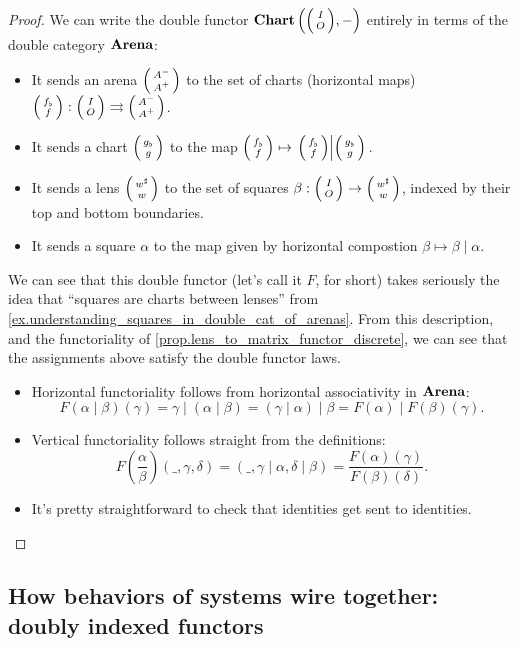 \documentclass[DynamicalBook]{subfiles}
\begin{document}
\begin{proof}
 

We can write the double functor $\Cat{Chart}\left(\littlelens{I}{O}, - \right)$
entirely in terms of the double category $\textbf{Arena}$:
\begin{itemize}
  \item It sends an arena $\lens{A^-}{A^+}$ to the set of charts (horizontal
    maps) $\lens{f_{\flat}}{f} : \lens{I}{O}  \tto \lens{A^-}{A^+}$.
  \item It sends a chart $\lens{g_{\flat}}{g}$ to the map $\lens{f_{\flat}}{f}
    \mapsto \left. \lens{f_{\flat}}{f} \middle| \lens{g_{\flat}}{g} \right.$.
  \item It sends a lens $\lens{w^{\sharp}}{w}$ to the set of squares $\beta :
    \lens{I}{O} \to \lens{w^{\sharp}}{w}$, indexed by their top and bottom
    boundaries.
  \item It sends a square $\alpha$ to the map given by horizontal compostion
    $\beta \mapsto \beta \mid \alpha$.
\end{itemize}

We can see that this double functor (let's call it $F$, for short) takes seriously the idea that ``squares are
charts between lenses'' from
\cref{ex.understanding_squares_in_double_cat_of_arenas}. From this description,
and the functoriality of \cref{prop.lens_to_matrix_functor_discrete}, we can see
that the assignments above satisfy the double functor laws. 
\begin{itemize}
  \item Horizontal functoriality follows from horizontal associativity in
    $\textbf{Arena}$:
$$F(\alpha\mid \beta)(\gamma) = \gamma \mid (\alpha \mid \beta) = (\gamma \mid
\alpha) \mid \beta = F(\alpha) \mid F(\beta) (\gamma).$$
\item Vertical functoriality follows straight from the definitions:
  $$F\left( \frac{\alpha}{\beta} \right)(\_, \gamma, \delta) = (\_, \gamma \mid
  \alpha, \delta \mid \beta) = \frac{F(\alpha)(\gamma)}{F(\beta)(\delta)}.$$
\item It's pretty straightforward to check that identities get sent to identities.
\end{itemize}
\end{proof}



\subsection{How behaviors of systems wire together: doubly indexed functors}
\end{document}

